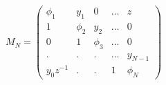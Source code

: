\begin{equation}
M_{N} =
 \begin{pmatrix}
  \phi_1        &   y_1   &   0    & \dots & z         \\
   1            & \phi_2  &  y_2   & \dots & 0         \\
   0            &    1    & \phi_3 & \dots & 0         \\
   .            &    .    &  .     & \dots & y_{N-1}   \\
   y_{0} z^{-1} &    .    &  .     &   1   & \phi_N
 \end{pmatrix}
\label{UNmatrix}
\end{equation}

